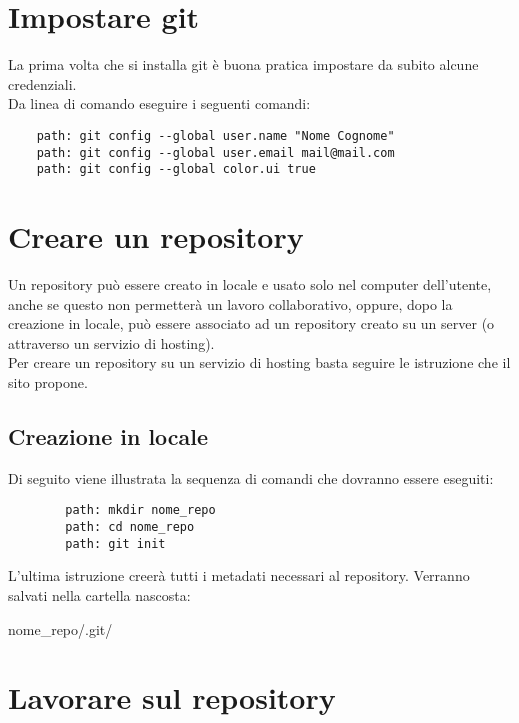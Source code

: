 
\newpage \clearpage
\section{Impostare git} %
\label{sec:impostare_git}
La prima volta che si installa git è buona pratica impostare da subito alcune credenziali. \\
Da linea di comando eseguire i seguenti comandi:
	\begin{verbatim}
	path: git config --global user.name "Nome Cognome"
	path: git config --global user.email mail@mail.com
	path: git config --global color.ui true
	\end{verbatim}


\newpage \clearpage
\section{Creare un repository} %
\label{sec:creare_un_repository}
Un repository può essere creato in locale e usato solo nel computer dell'utente, anche se questo non permetterà un lavoro collaborativo, oppure, dopo la creazione in locale, può essere associato ad un repository creato su un server (o attraverso un servizio di hosting). \\
Per creare un repository su un servizio di hosting basta seguire le istruzione che il sito propone.
	\subsection{Creazione in locale} %
	\label{sub:creazione_in_locale}
	Di seguito viene illustrata la sequenza di comandi che dovranno essere eseguiti:
		\begin{verbatim}
		path: mkdir nome_repo
		path: cd nome_repo
		path: git init
		\end{verbatim}
	\noindent
	L'ultima istruzione creerà tutti i metadati necessari al repository. Verranno salvati nella cartella nascosta:
		\begin{center}
			nome\_repo/.git/
		\end{center}

	

\newpage \clearpage
\section{Lavorare sul repository} %
\label{sec:lavorare_sul_repository}

